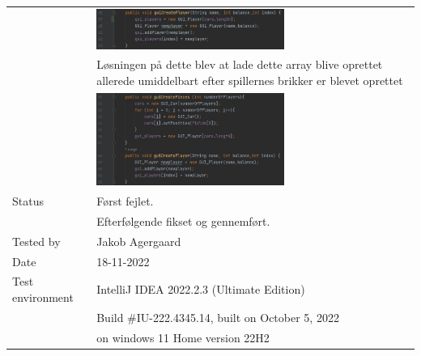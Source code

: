 \documentclass{article}
\begin{document}
\begin{tabular}{ | m{} | m{}|}
     & \includegraphics[width = 0.6\textwidth]{Billeder/TC02-3.jpg}\\
     & Løsningen på dette blev at lade dette array blive oprettet allerede umiddelbart efter spillernes brikker er blevet oprettet\\
     & \includegraphics[width = 0.6\textwidth]{Billeder/TC02-4.jpg}\\
    \hline
    Status & Først fejlet.\\
     & Efterfølgende fikset og gennemført.\\
    \hline
    Tested by & Jakob Agergaard\\
    \hline
    Date & 18-11-2022\\
    \hline
    Test environment & IntelliJ IDEA 2022.2.3 (Ultimate Edition)\\
      & Build \#IU-222.4345.14, built on October 5, 2022\\
      & on windows 11 Home version 22H2\\
    \hline
\end{tabular}
\end{document}
